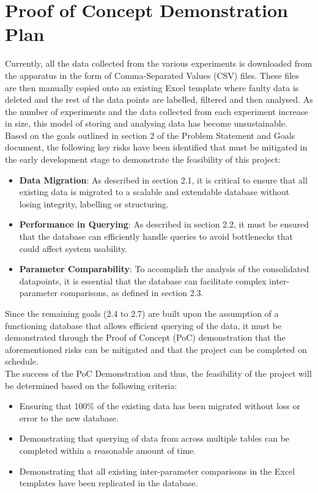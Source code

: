 \documentclass{article}
\begin{document}
\section{Proof of Concept Demonstration Plan}

Currently, all the data collected from the various experiments is downloaded from the 
apparatus in the form of Comma-Separated Values (CSV) files. These files are then manually
copied onto an existing Excel template where faulty data is deleted and the rest of the data points
are labelled, filtered and then analysed. As the number of experiments and the data collected
from each experiment increase in size, this model of storing and analysing data has
become unsustainable.\\
\newline
\noindent Based on the goals outlined in section 2 of the Problem Statement and Goals document,
the following key risks have been identified that must be mitigated in the early development
stage to demonstrate the feasibility of this project:
\begin{itemize}
  \item \textbf{Data Migration}: As described in section 2.1, it is critical to ensure that all existing 
  data is migrated to a scalable and extendable database without losing integrity, labelling or structuring.
  \item \textbf{Performance in Querying}: As described in section 2.2, it must be ensured that the database can 
  efficiently handle queries to avoid bottlenecks that could affect system usability.
  \item \textbf{Parameter Comparability}: To accomplish the analysis of the consolidated datapoints, it is essential
  that the database can facilitate complex inter-parameter comparisons, as defined in section 2.3.
\end{itemize}

\noindent Since the remaining goals (2.4 to 2.7) are built upon the assumption of a functioning database that 
allows efficient querying of the data, it must be demonstrated through the Proof of Concept (PoC) demonstration that the aforementioned 
risks can be mitigated and that the project can be completed on schedule.\\
\newline
\noindent The success of the PoC Demonstration and thus, the feasibility of the project will be determined based 
on the following criteria:
\begin{itemize}
  \item Ensuring that 100\% of the existing data has been migrated without loss or error to the new database.
  \item Demonstrating that querying of data from across multiple tables can be completed within a reasonable amount of time.
  \item Demonstrating that all existing inter-parameter comparisons in the Excel templates have been replicated in the database.
\end{itemize}
\end{document}
